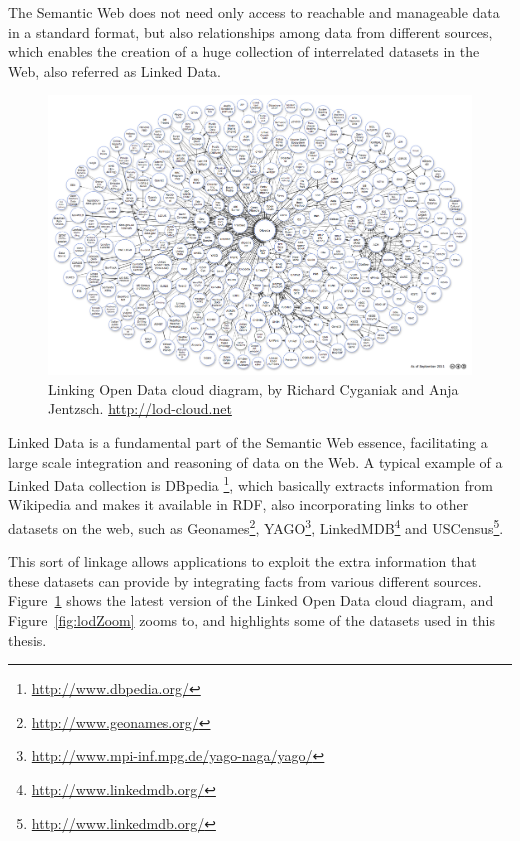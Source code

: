 The Semantic Web does not need only access to reachable and manageable data in a standard format, but also
relationships among data from different sources, which enables the creation of a huge collection of interrelated
datasets in the Web, also referred as Linked Data.

\begin{figure}[h!]
\begin{center}
  \includegraphics[width=1\linewidth]{./Figures/lod-datasets_2011-09-19.png}
\end{center}
\caption{Linking Open Data cloud diagram, by Richard Cyganiak and Anja Jentzsch. \url{http://lod-cloud.net}}
\label{fig:lod}
\end{figure}

Linked Data is a fundamental part of the Semantic Web essence, facilitating a large scale integration and reasoning
of data on the Web. A typical example of a Linked Data collection is DBpedia
{\footnote{\url{http://www.dbpedia.org/}}}, which basically extracts information from Wikipedia and
makes it available in RDF, also incorporating links to other datasets on the web, such as 
Geonames\footnote{\url{http://www.geonames.org/}},
YAGO\footnote{\url{http://www.mpi-inf.mpg.de/yago-naga/yago/}}, 
LinkedMDB\footnote{\url{http://www.linkedmdb.org/}} and 
USCensus\footnote{\url{http://www.linkedmdb.org/}}. 

This sort of linkage allows applications to exploit the extra information that these datasets can provide by integrating
facts from various different sources. Figure~\ref{fig:lod} shows the latest version of the Linked Open Data cloud
diagram, and Figure~\ref{fig:lodZoom} zooms to, and highlights some of the datasets used in this thesis.

